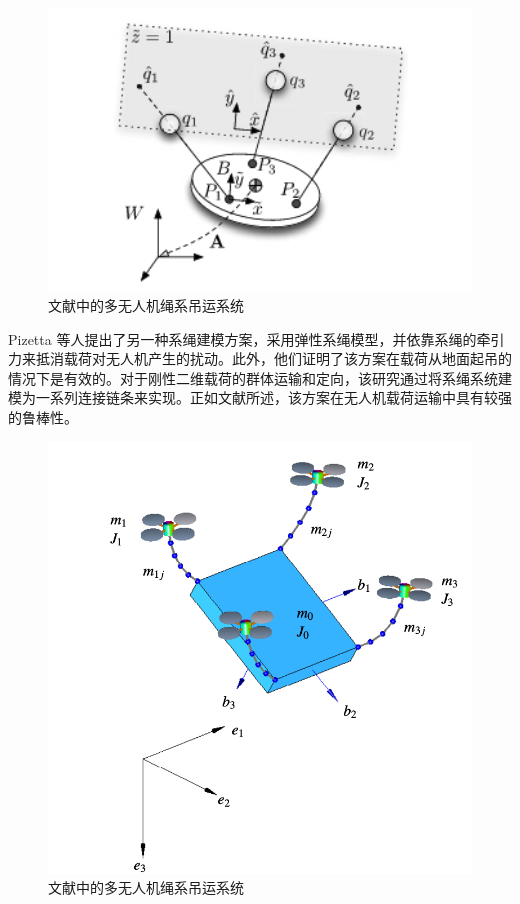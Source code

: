 \documentclass[lang=chs, degree=master, blindreview=false, winfonts=true]{yanputhesis}
\begin{document}
\begin{figure}[hbt!]
	\centering
	\includegraphics[width=28pc]{picture/1_5.png} 
	\caption{文献中的多无人机绳系吊运系统} \label{1_5}
\end{figure}





Pizetta 等人提出了另一种系绳建模方案，采用弹性系绳模型，并依靠系绳的牵引力来抵消载荷对无人机产生的扰动\cite{pizetta2019avoiding}。此外，他们证明了该方案在载荷从地面起吊的情况下是有效的。对于刚性二维载荷的群体运输和定向，该研究通过将系绳系统建模为一系列连接链条来实现\cite{goodarzi2016stabilization}。正如文献所述，该方案在无人机载荷运输中具有较强的鲁棒性。
\begin{figure}[hbt!]
	\centering
	\includegraphics[width=28pc]{picture/1_6.png} 
	\caption{文献中的多无人机绳系吊运系统} \label{1_6}
\end{figure}
\end{document}
